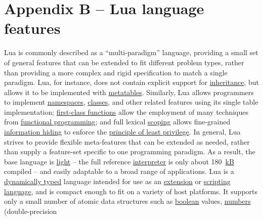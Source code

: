 \documentclass[a4paper]{article}
\begin{document}
\bigskip

\section[Appendix B {}-- Lua language features]{
Appendix B -- Lua language features}
{
Lua is commonly described as a
{\textquotedblleft}multi-paradigm{\textquotedblright} language,
providing a small set of general features that can be extended to fit
different problem types, rather than providing a more complex and rigid
specification to match a single paradigm. Lua, for instance, does not
contain explicit support for
\href{http://en.wikipedia.org/wiki/Inheritance_(object-oriented_programming)}{inheritance},
but allows it to be implemented with
\href{http://en.wikipedia.org/wiki/Metatable}{metatables}. Similarly,
Lua allows programmers to implement
\href{http://en.wikipedia.org/wiki/Namespaces}{namespaces},
\href{http://en.wikipedia.org/wiki/Class_(computer_science)}{classes},
and other related features using its single table implementation;
\href{http://en.wikipedia.org/wiki/First-class_function}{first-class
functions} allow the employment of many techniques from
\href{http://en.wikipedia.org/wiki/Functional_programming}{functional
programming}; and full lexical
\href{http://en.wikipedia.org/wiki/Scope_(programming)}{scoping} allows
fine-grained
\href{http://en.wikipedia.org/wiki/Information_hiding}{information
hiding} to enforce the
\href{http://en.wikipedia.org/wiki/Principle_of_least_privilege}{principle
of least privilege}. In general, Lua strives to provide flexible
meta-features that can be extended as needed, rather than supply a
feature-set specific to one programming paradigm. As a result, the base
language is
\href{http://en.wikipedia.org/wiki/Lightweight_programming_language}{light}
-- the full reference
\href{http://en.wikipedia.org/wiki/Interpreter_(computing)}{interpreter}
is only about 180~\href{http://en.wikipedia.org/wiki/Kilobyte}{kB}
compiled -- and easily adaptable to a broad range of applications. Lua
is a \href{http://en.wikipedia.org/wiki/Dynamically_typed}{dynamically
typed} language intended for use as an
\href{http://en.wikipedia.org/wiki/Scripting_language}{extension} or
\href{http://en.wikipedia.org/wiki/Scripting_language}{scripting
language}, and is compact enough to fit on a variety of host platforms.
It supports only a small number of atomic data structures such as
\href{http://en.wikipedia.org/wiki/Boolean_data_type}{boolean} values,
\href{http://en.wikipedia.org/wiki/Number}{numbers} (double-precision
}
\end{document}
